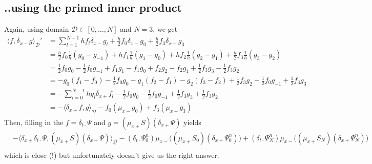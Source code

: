 \documentclass[dvipsnames]{article}
\def\dxp{\delta_{x+}}
\def\dxm{\delta_{x-}}
\def\mup{\mu_{x+}}
\def\mum{\mu_{x-}}
\def\dtd{\delta_{t\cdot}}
\begin{document}
\subsection{..using the primed inner product}
Again, using domain $\mathcal{D} \in [0, \hdots, N]$ and $N = 3$, we get
\begin{equation}
\begin{aligned}
    \langle f, \dxm g\rangle_\mathcal{D}' &= \sum_{l=1}^{N-1} hf_l\dxm g_l + \frac{h}{2}f_0\dxm g_0 + \frac{h}{2}f_3\dxm g_3\\
    &= \frac{h}{2}f_0\frac{1}{h}(g_0-g_{-1})+hf_1\frac{1}{h}(g_1-g_0)+ hf_2\frac{1}{h}(g_2-g_1)+ \frac{h}{2}f_3\frac{1}{h}(g_3-g_{2})\\
    &= \frac{1}{2}f_0g_0-\frac{1}{2}f_0g_{-1}+f_1g_1-f_1g_0+f_2g_2-f_2g_1+\frac{1}{2}f_3g_3-\frac{1}{2}f_3g_2\\
    &= -g_0(f_1-f_0) - \frac{1}{2}f_0g_0-g_1(f_2-f_1)-g_2(f_3-f_2) + \frac{1}{2}f_3g_2-\frac{1}{2}f_0g_{-1}+\frac{1}{2}f_3g_3\\
    &= -\sum_{l=0}^{N-1}hg_l\dxp f_l - \frac{1}{2}f_0g_0-\frac{1}{2}f_0g_{-1}+\frac{1}{2}f_3g_3+\frac{1}{2}f_3g_2\\
    &= -\langle \dxp f, g \rangle_{\underline{\mathcal{D}}}-f_0(\mum g_0)+f_3(\mum g_3)
\end{aligned}
    \end{equation}
Then, filling in the $f=\dtd\Psi$ and $g = (\mup S)(\dxp \Psi)$ yields
\begin{equation}
    \begin{aligned}
        &-\langle \dxp \dtd\Psi, (\mup S)(\dxp \Psi)\rangle_\mathcal{\underline{D}} - (\dtd\Psi_0^n)\mum\big((\mup S_0)(\dxp \Psi_0^n)\big) + (\dtd\Psi_N^n)\mum\big((\mup S_N)(\dxp \Psi_N^n)\big)\\
    \end{aligned}
\end{equation}
which is close (!) but unfortunately doesn't give us the right answer. 
\end{document}
